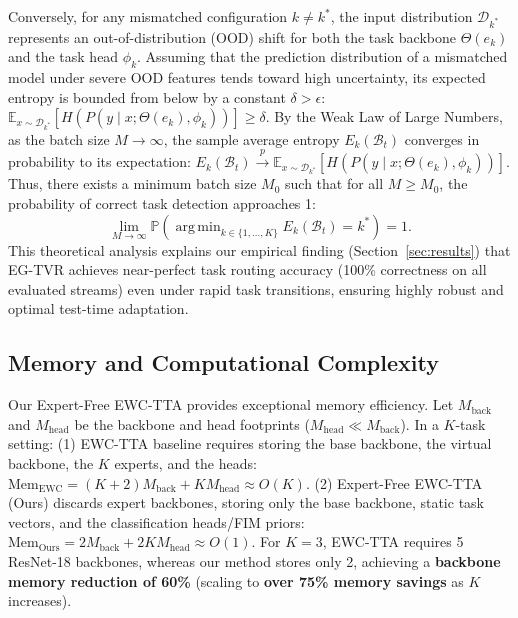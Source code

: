 \documentclass{article}
\theoremstyle{plain}
\theoremstyle{definition}
\theoremstyle{remark}
\begin{document}
Conversely, for any mismatched configuration $k \neq k^*$, the input distribution $\mathcal{D}_{k^*}$ represents an out-of-distribution (OOD) shift for both the task backbone $\Theta(e_k)$ and the task head $\phi_k$. Assuming that the prediction distribution of a mismatched model under severe OOD features tends toward high uncertainty, its expected entropy is bounded from below by a constant $\delta > \epsilon$: $\mathbb{E}_{x \sim \mathcal{D}_{k^*}} \left[ H\left(P\left(y \mid x; \Theta(e_k), \phi_k\right)\right) \right] \geq \delta$.
By the Weak Law of Large Numbers, as the batch size $M \rightarrow \infty$, the sample average entropy $E_k(\mathcal{B}_t)$ converges in probability to its expectation: $E_k(\mathcal{B}_t) \xrightarrow{p} \mathbb{E}_{x \sim \mathcal{D}_{k^*}} \left[ H\left(P\left(y \mid x; \Theta(e_k), \phi_k\right)\right) \right]$.
Thus, there exists a minimum batch size $M_0$ such that for all $M \geq M_0$, the probability of correct task detection approaches 1:
\begin{equation}
    \lim_{M \to \infty} \mathbb{P}\left( \operatorname{arg\,min}_{k \in \{1,\dots,K\}} E_k(\mathcal{B}_t) = k^* \right) = 1.
\end{equation}
This theoretical analysis explains our empirical finding (Section~\ref{sec:results}) that EG-TVR achieves near-perfect task routing accuracy (100\% correctness on all evaluated streams) even under rapid task transitions, ensuring highly robust and optimal test-time adaptation.

\subsection{Memory and Computational Complexity}
Our Expert-Free EWC-TTA provides exceptional memory efficiency. Let $M_{\text{back}}$ and $M_{\text{head}}$ be the backbone and head footprints ($M_{\text{head}} \ll M_{\text{back}}$). In a $K$-task setting: (1) EWC-TTA baseline requires storing the base backbone, the virtual backbone, the $K$ experts, and the heads: $\text{Mem}_{\text{EWC}} = (K + 2) M_{\text{back}} + K M_{\text{head}} \approx O(K)$. (2) Expert-Free EWC-TTA (Ours) discards expert backbones, storing only the base backbone, static task vectors, and the classification heads/FIM priors: $\text{Mem}_{\text{Ours}} = 2 M_{\text{back}} + 2K M_{\text{head}} \approx O(1)$. For $K=3$, EWC-TTA requires 5 ResNet-18 backbones, whereas our method stores only 2, achieving a \textbf{backbone memory reduction of 60\%} (scaling to \textbf{over 75\% memory savings} as $K$ increases).
\end{document}
